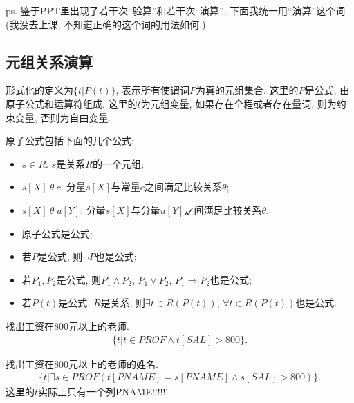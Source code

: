 ps. 鉴于PPT里出现了若干次“验算”和若干次“演算”, 下面我统一用“演算”这个词(我没去上课, 不知道正确的这个词的用法如何.)

\subsection{元组关系演算}

\begin{definition}[元组关系演算]
    形式化的定义为$\{t | P(t)\}$, 表示所有使谓词$P$为真的元组集合. 这里的$P$是公式, 由原子公式和运算符组成. 这里的$t$为元组变量, 如果存在全程或者存在量词, 则为约束变量, 否则为自由变量.
\end{definition}

\begin{definition}[原子公式]
    原子公式包括下面的几个公式:
    \begin{itemize}
        \item $s\in R$: $s$是关系$R$的一个元组;
        \item $s[X]\ \theta\ c$: 分量$s[X]$与常量$c$之间满足比较关系$\theta$;
        \item $s[X]\ \theta\ u[Y]$: 分量$s[X]$与分量$u[Y]$之间满足比较关系$\theta$.
    \end{itemize}
\end{definition}

\begin{definition}[公式的递归定义]
    \begin{itemize}
        \item 原子公式是公式;
        \item 若$P$是公式, 则$\neg P$也是公式;
        \item 若$P_1,P_2$是公式, 则$P_1 \land P_2$, $P_1 \lor P_2$, $P_1 \Rightarrow P_2$也是公式;
        \item 若$P(t)$是公式, $R$是关系, 则$\exists t \in R(P(t))$, $\forall t \in R(P(t))$也是公式.
    \end{itemize}
\end{definition}

\begin{example}
    找出工资在800元以上的老师.
    \begin{align*}
        \{t | t \in PROF \land t[SAL] > 800\}.
    \end{align*}
\end{example}

\begin{example}
    找出工资在800元以上的老师的姓名.
    \begin{align*}
        \{t | \exists s \in PROF(t[PNAME]=s[PNAME]\land s[SAL]>800)\}.
    \end{align*}
    这里的$t$实际上只有一个列PNAME!!!!!!
\end{example}

